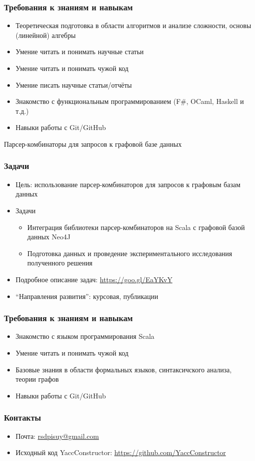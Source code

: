\documentclass{beamer}
\begin{document}
\begin{frame}
  \transwipe[direction=90]
  \frametitle{Требования к знаниям и навыкам}
  \begin{itemize}
    \item Теоретическая подготовка в области алгоритмов и анализе сложности, основы (линейной) алгебры
    \item Умение читать и понимать научные статьи
    \item Умение читать и понимать чужой код    
    \item Умение писать научные статьи/отчёты
    \item Знакомство с функциональным программированием (F\#, OCaml, Haskell и т.д.)
    \item Навыки работы с Git/GitHub
  \end{itemize}
\end{frame}


\begin{frame}[plain,c]
 \transwipe[direction=90]
 \begin{center}
  \Huge Парсер-комбинаторы для запросов к графовой базе данных
 \end{center}
\end{frame}

\begin{frame}[fragile]
\transwipe[direction=90]
\frametitle{Задачи}
\begin{itemize}
\item Цель: использование парсер-комбинаторов для запросов к графовым базам данных
\item Задачи
\begin{itemize}
\item Интеграция библиотеки парсер-комбинаторов на Scala с графовой базой данных Neo4J
\item Подготовка данных и проведение экспериментального исследования полученного решения
\end{itemize}
\item Подробное описание задач: \url{https://goo.gl/EaYKvY}
\item ``Направления развития'': курсовая, публикации
\end{itemize}
\end{frame}

\begin{frame}
  \transwipe[direction=90]
  \frametitle{Требования к знаниям и навыкам}
  \begin{itemize}
    \item Знакомство с языком программирования Scala
    \item Умение читать и понимать чужой код
    \item Базовые знания в области формальных языков, синтаксичского анализа, теории графов
    \item Навыки работы с Git/GitHub
  \end{itemize}
\end{frame}

            
\begin{frame}
\transwipe[direction=90]
\frametitle{Контакты}
\begin{itemize}
  \item Почта: \url{rsdpisuy@gmail.com}
  \item Исходный код YaccConstructor: \url{https://github.com/YaccConstructor}
\end{itemize}
\end{frame}
\end{document}
